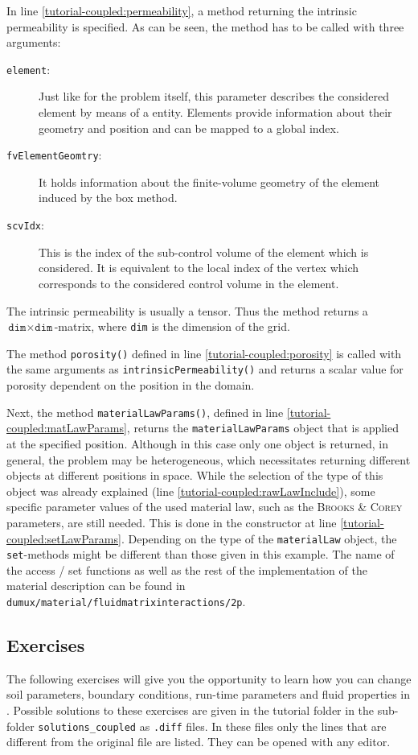 In line \ref{tutorial-coupled:permeability}, a method returning the
intrinsic permeability is specified. As can be seen, the method has
to be called with three arguments:
\begin{description}
\item[\texttt{element}:] Just like for the problem itself, this
  parameter describes the considered element by means of a \Dune
  entity. Elements provide information about their geometry and
  position and can be mapped to a global index.
\item[\texttt{fvElementGeomtry}:] It holds information about the finite-volume
  geometry of the element induced by the box method.
\item[\texttt{scvIdx}:] This is the index of the sub-control volume of the
  element which is considered. It is equivalent to the local index
  of the vertex which corresponds to the considered control volume in
  the element.
\end{description}

The intrinsic permeability is usually a tensor. Thus the method returns
a $\texttt{dim} \times \texttt{dim}$-matrix, where \texttt{dim} is the
dimension of the grid.

The method \texttt{porosity()} defined in line
\ref{tutorial-coupled:porosity} is called with the same arguments as
\texttt{intrinsicPermeability()} and returns a scalar value for
porosity dependent on the position in the domain.

Next, the method \texttt{materialLawParams()}, defined in line
\ref{tutorial-coupled:matLawParams}, returns the
\verb+materialLawParams+ object that is applied at the specified
position. Although in this case only one object is returned, in
general, the problem may be heterogeneous, which necessitates
returning different objects at different positions in space.  While
the selection of the type of this object was already explained (line
\ref{tutorial-coupled:rawLawInclude}), some specific parameter values
of the used material law, such as the \textsc{Brooks} \&
\textsc{Corey} parameters, are still needed. This is done in the
constructor at line \ref{tutorial-coupled:setLawParams}.  Depending on
the type of the \texttt{materialLaw} object, the \texttt{set}-methods
might be different than those given in this example. The name of the
access / set functions as well as the rest of the implementation of
the material description can be found in
\verb+dumux/material/fluidmatrixinteractions/2p+.

\subsection{Exercises}
\label{tutorial-coupled:exercises}
The following exercises will give you the opportunity to learn how you
can change soil parameters, boundary conditions, run-time parameters
and fluid properties in \Dumux. Possible solutions to these exercises are given in the tutorial folder in the
sub-folder \texttt{solutions\_coupled} as \texttt{.diff} files. In these files only the lines that are different from the original file are listed. 
They can be opened with any editor.

